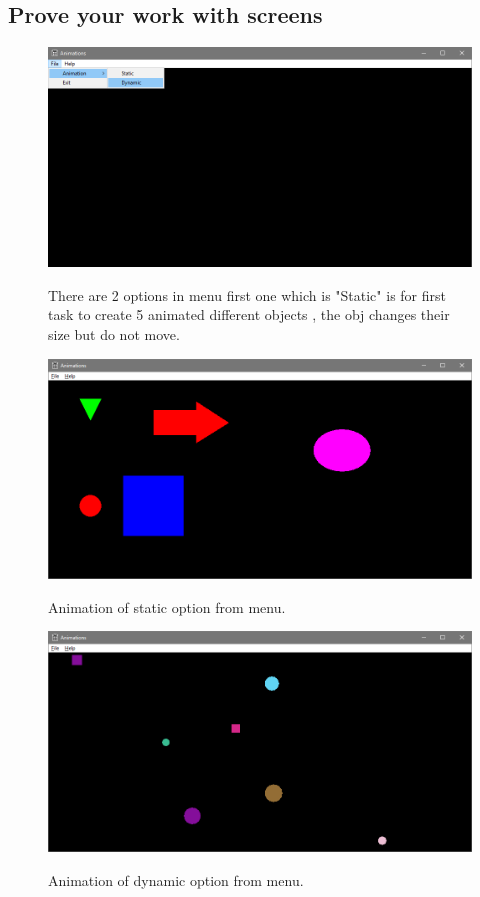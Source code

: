 \clearpage
\subsection{Prove your work with screens}



\begin{figure}[h!]
  \centering
    {%
      \includegraphics[width=1\textwidth]{1}}
  \caption{There are 2 options in menu first one which is "Static" is for first task to create 5 animated different objects , the obj changes their size but do not move.}
\end{figure}

\begin{figure}[h!]
  \centering
    {%
      \includegraphics[width=1\textwidth]{2}}
  \caption{Animation of static option from menu.}
\end{figure}

\begin{figure}[h!]
  \centering
    {%
      \includegraphics[width=1\textwidth]{3}}
  \caption{Animation of dynamic option from menu.}
\end{figure}

 
